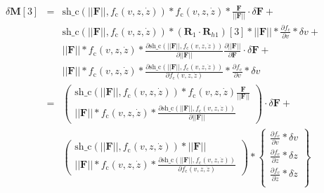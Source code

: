 \documentclass[10pt,fleqn,subeqn]{report}
\newcommand{\T}[1]{\bm{#1}}
\begin{document}
\begin{eqnarray*}
\delta \T M[3] &=& \mathrm{sh\_c}(||\T F||, f_{\mathrm{c}}(v,z,\dot{z})) * 
		f_{\mathrm{c}}(v,z,\dot{z}) *
		\frac{\displaystyle\T F}{\displaystyle||\T F||} 
		\cdot \delta \T F+\\
	&& \mathrm{sh\_c}(||\T F||, f_{\mathrm{c}}(v,z,\dot{z})) * (\T R_1\cdot \T R_{h1})[3] * 
		||\T F|| *
		\frac{\displaystyle \partial f_{\mathrm{c}}}
			{\displaystyle \partial v} * \delta v+\\
	&&	||\T F|| * f_{\mathrm{c}}(v,z,\dot{z}) *
			\frac{\displaystyle \partial \mathrm{sh\_c}(||\T F||, f_{\mathrm{c}}(v,z,\dot{z}))}
			{\displaystyle \partial ||\T F||} 
			\frac{\displaystyle \partial ||\T F||}{\displaystyle\partial\T F}
			\cdot \delta \T F+\\
	&&	||\T F|| * f_{\mathrm{c}}(v,z,\dot{z}) *
			\frac{\displaystyle \partial \mathrm{sh\_c}(||\T F||, f_{\mathrm{c}}(v,z,\dot{z}))}
			{\displaystyle \partial f_{\mathrm{c}}(v,z,\dot{z})} *
			\frac{\displaystyle \partial f_{\mathrm{c}}}
				{\displaystyle \partial v} * \delta v\\
	&=& \left (\begin{array}{l}
		\mathrm{sh\_c}(||\T F||, f_{\mathrm{c}}(v,z,\dot{z})) * 
			f_{\mathrm{c}}(v,z,\dot{z})
			\frac{\displaystyle\T F}{\displaystyle||\T F||}\\
		||\T F|| * f_{\mathrm{c}}(v,z,\dot{z}) *
			\frac{\displaystyle \partial \mathrm{sh\_c}(||\T F||, f_{\mathrm{c}}(v,z,\dot{z}))}
			{\displaystyle \partial ||\T F||}
		\end{array} 
		\right )\cdot \delta \T F+\\
	&& \left ( \begin{array}{l}
		\mathrm{sh\_c}(||\T F||, f_{\mathrm{c}}(v,z,\dot{z})) * ||\T F||\\
		||\T F|| * f_{\mathrm{c}}(v,z,\dot{z}) *
			\frac{\displaystyle \partial \mathrm{sh\_c}(||\T F||, f_{\mathrm{c}}(v,z,\dot{z}))}
			{\displaystyle \partial f_{\mathrm{c}}(v,z,\dot{z})}
		\end{array} \right ) *
		\left\{\begin{array}{l}
			\frac{\displaystyle \partial f_{\mathrm{c}}}
				{\displaystyle \partial v} * \delta v\\
			\frac{\displaystyle \partial f_{\mathrm{c}}}
				{\displaystyle \partial z} * \delta z\\
			\frac{\displaystyle \partial f_{\mathrm{c}}}
				{\displaystyle \partial \dot{z}} * \delta \dot{z}\\			
		\end{array}\right\}
\end{eqnarray*}
\end{document}
